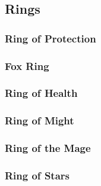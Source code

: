 \subsection{Rings}

\subsubsection{Ring of Protection}

\subsubsection{Fox Ring}

\subsubsection{Ring of Health}

\subsubsection{Ring of Might}

\subsubsection{Ring of the Mage}

\subsubsection{Ring of Stars}